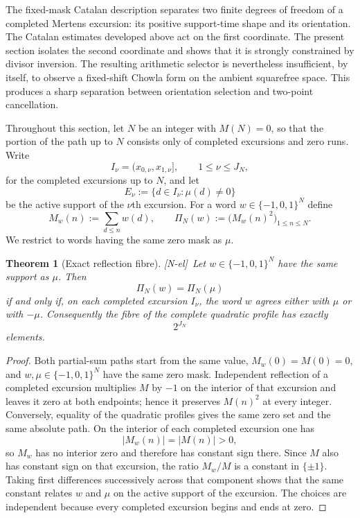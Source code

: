 \documentclass[11pt,reqno]{amsart}
\numberwithin{equation}{section}
\theoremstyle{plain}
\newtheorem{theorem}{Theorem}[section]
\theoremstyle{definition}
\theoremstyle{remark}
\newcommand{\tagNE}{\textup{[N-el]}}
\begin{document}
The fixed-mask Catalan description separates two finite degrees of freedom of a completed Mertens excursion: its positive support-time shape and its orientation.  The Catalan estimates developed above act on the first coordinate.  The present section isolates the second coordinate and shows that it is strongly constrained by divisor inversion.  The resulting arithmetic selector is nevertheless insufficient, by itself, to observe a fixed-shift Chowla form on the ambient squarefree space.  This produces a sharp separation between orientation selection and two-point cancellation.

Throughout this section, let $N$ be an integer with $M(N)=0$, so that the portion of the path up to $N$ consists only of completed excursions and zero runs.  Write
\begin{equation}
I_\nu=(x_{0,\nu},x_{1,\nu}],\qquad 1\le \nu\le J_N,
\end{equation}
for the completed excursions up to $N$, and let
\begin{equation}
E_\nu:=\{d\in I_\nu:\mu(d)\ne0\}
\end{equation}
be the active support of the $\nu$th excursion.  For a word $w\in\{-1,0,1\}^N$ define
\begin{equation}
M_w(n):=\sum_{d\le n}w(d),\qquad
\Pi_N(w):=\bigl(M_w(n)^2\bigr)_{1\le n\le N}.
\end{equation}
We restrict to words having the same zero mask as $\mu$.

\begin{theorem}[Exact reflection fibre]
\label{thm:exact-reflection-fibre}
\tagNE\ Let $w\in\{-1,0,1\}^N$ have the same support as $\mu$.  Then
\begin{equation}
\Pi_N(w)=\Pi_N(\mu)
\end{equation}
if and only if, on each completed excursion $I_\nu$, the word $w$ agrees either with $\mu$ or with $-\mu$.  Consequently the fibre of the complete quadratic profile has exactly
\begin{equation}
2^{J_N}
\end{equation}
elements.
\end{theorem}

\begin{proof}
Both partial-sum paths start from the same value, $M_w(0)=M(0)=0$, and $w,\mu\in\{-1,0,1\}^N$ have the same zero mask.  Independent reflection of a completed excursion multiplies $M$ by $-1$ on the interior of that excursion and leaves it zero at both endpoints; hence it preserves $M(n)^2$ at every integer.  Conversely, equality of the quadratic profiles gives the same zero set and the same absolute path.  On the interior of each completed excursion one has
\begin{equation}
|M_w(n)|=|M(n)|>0,
\end{equation}
so $M_w$ has no interior zero and therefore has constant sign there.  Since $M$ also has constant sign on that excursion, the ratio $M_w/M$ is a constant in $\{\pm1\}$.  Taking first differences successively across that component shows that the same constant relates $w$ and $\mu$ on the active support of the excursion.  The choices are independent because every completed excursion begins and ends at zero.
\end{proof}
\end{document}

